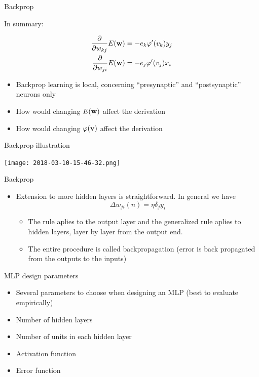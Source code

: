 \documentclass[notes]{beamer}
\providecommand{\tightlist}{%
  \setlength{\itemsep}{0pt}\setlength{\parskip}{0pt}}
\begin{document}
\begin{frame}{Backprop}

In summary:

\begin{align}
    \frac{\partial }{\partial w_{kj} } E(\mathbf{w}) & =   -e_k \varphi ' (v_k) y_j \\
    \frac{\partial }{\partial w_{ji}} E(\mathbf{w})  & =   -e_j \varphi ' (v_j) x_i
\end{align}

\begin{itemize}
\tightlist
\item
  Backprop learning is local, concerning ``presynaptic'' and
  ``postsynaptic'' neurons only
\item
  How would changing \(E(\mathbf{w})\) affect the derivation
\item
  How would changing \(\varphi (\mathbf{v})\) affect the derivation
\end{itemize}

\end{frame}

\begin{frame}{Backprop illustration}

\texttt{[image: 2018-03-10-15-46-32.png]} ~

\end{frame}

\begin{frame}{Backprop}

\begin{itemize}
\tightlist
\item
  Extension to more hidden layers is straightforward. In general we have
  \[ \Delta w_ {ji} (n) = \eta \delta _j y_i\]

  \begin{itemize}
  \tightlist
  \item
    The rule aplies to the output layer and the generalized rule aplies
    to hidden layers, layer by layer from the output end.
  \item
    The entire procedure is called backpropagation (error is back
    propagated from the outputs to the inputs)
  \end{itemize}
\end{itemize}

\end{frame}

\begin{frame}{MLP design parameters}

\begin{itemize}
\tightlist
\item
  Several parameters to choose when designing an MLP (best to evaluate
  empirically)
\item
  Number of hidden layers
\item
  Number of units in each hidden layer
\item
  Activation function
\item
  Error function
\end{itemize}

\end{frame}
\end{document}
